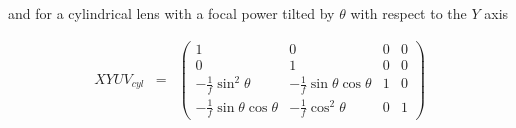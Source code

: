 \documentclass[12pt,a4paper,twoside,openright,BCOR10mm,headsepline,titlepage,abstracton,chapterprefix,final]{scrreprt}
\begin{document}
and for a cylindrical lens with a focal power tilted by $\theta$ with respect to the $Y$ axis

\begin{eqnarray}
XYUV_{cyl} &=&
 \begin{pmatrix}
  1 & 0 & 0 & 0 \\
  0 & 1 & 0 & 0 \\
  -\frac{1}{f} \sin^2\theta & -\frac{1}{f} \sin\theta \cos\theta & 1 & 0 \\
  -\frac{1}{f} \sin\theta \cos\theta & -\frac{1}{f} \cos^2\theta & 0 & 1
 \end{pmatrix}
\end{eqnarray}
\end{document}
